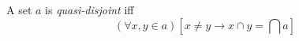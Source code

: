 A set $a$ is \textit{quasi-disjoint} iff
$$(\forall x, y \in a)[x \neq y \rightarrow x \cap y = \bigcap a]$$
